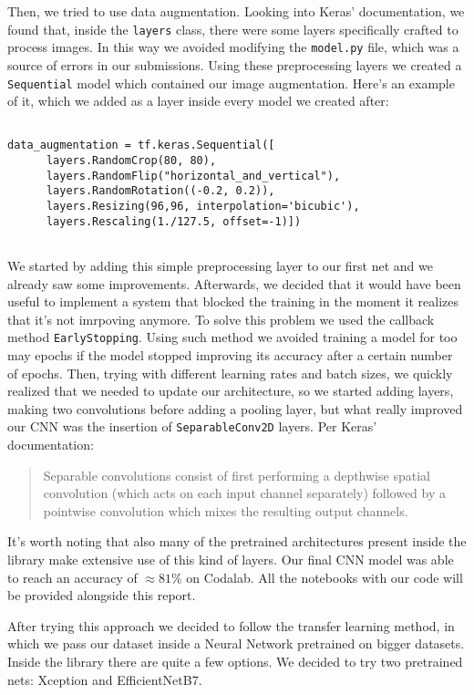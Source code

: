 \documentclass[a4paper,11pt]{article}
\newcommand{\code}[1]{\texttt{#1}}
\numberwithin{equation}{section}
\begin{document}
Then, we tried to use data augmentation. Looking into Keras' documentation, we found that, inside the \code{layers} class, there were some layers specifically crafted to process images. In this way we avoided modifying the \code{model.py} file, which was a source of errors in our submissions. Using these preprocessing layers we created a \code{Sequential} model which contained our image augmentation. Here's an example of it, which we added as a layer inside every model we created after:
\begin{verbatim}
    
data_augmentation = tf.keras.Sequential([
      layers.RandomCrop(80, 80),
      layers.RandomFlip("horizontal_and_vertical"),
      layers.RandomRotation((-0.2, 0.2)),
      layers.Resizing(96,96, interpolation='bicubic'),
      layers.Rescaling(1./127.5, offset=-1)])
  
\end{verbatim}
We started by adding this simple preprocessing layer to our first net and we already saw some improvements. Afterwards, we decided that it would have been useful to implement a system that blocked the training in the moment it realizes that it's not imrpoving anymore. To solve this problem we used the callback method \code{EarlyStopping}. Using such method we avoided training a model for too may epochs if the model stopped improving its accuracy after a certain number of epochs. Then, trying with different learning rates and batch sizes, we quickly realized that we needed to update our architecture, so we started adding layers, making two convolutions before adding a pooling layer, but what really improved our CNN was the insertion of \code{SeparableConv2D} layers. Per Keras' documentation:
\begin{quote}
      Separable convolutions consist of first performing a depthwise spatial convolution (which acts on each input channel separately) followed by a pointwise convolution which mixes the resulting output channels.
\end{quote}
It's worth noting that also many of the pretrained architectures present inside the library make extensive use of this kind of layers. Our final CNN model was able to reach an accuracy of \(\approx 81\%\) on Codalab. All the notebooks with our code will be provided alongside this report.

After trying this approach we decided to follow the transfer learning method, in which we pass our dataset inside a Neural Network pretrained on bigger datasets. Inside the library there are quite a few options. We decided to try two pretrained nets: Xception and EfficientNetB7. 
\end{document}
